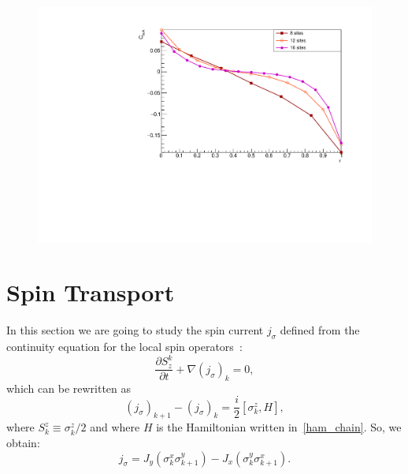 \begin{figure}[H]
    \centering
    \includegraphics[scale=0.7]{Figures/CFBulkVSSizeGamma1J1051.pdf}
    \caption{}
    \label{fig:my_label}
\end{figure}

\section{Spin Transport}
In this section we are going to study the spin current $j_\sigma$ defined from the continuity equation for the local spin operators~\cite{BenentiCasatiProsenRossini}:
\begin{equation}
    \frac{\partial S^k_z}{\partial t} + \nabla (j_\sigma)_k = 0,
\end{equation}
which can be rewritten as
\begin{equation}
    (j_\sigma)_{k+1}-(j_\sigma)_k = \frac{i}{2}[\sigma_k^z , H],
\end{equation}
where $S_k^z \equiv \sigma_k^z/2$ and where $H$ is the Hamiltonian written in~\ref{ham_chain}. So, we obtain:
\begin{equation}
    j_\sigma = J_y (\sigma_k^x \sigma_{k+1}^y) - J_x (\sigma_k^y \sigma_{k+1}^x).
\end{equation}

